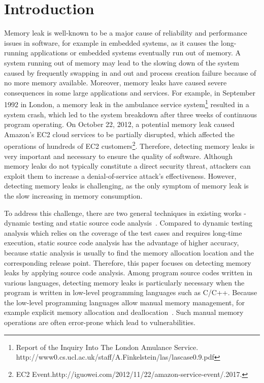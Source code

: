 \section{Introduction}\label{sec:intro}
Memory leak is well-known to be a major cause of reliability and performance issues in software, for example in embedded systems, as it causes the long-running applications or embedded systems eventually run out of memory. 
A system running out of memory may lead to the slowing down of the system caused by frequently swapping in and out and process creation failure because of no more memory available. Moreover, memory leaks have caused severe consequences in some large applications and services. For example, in September 1992 in London, a memory leak in the ambulance service system\footnote{Report of the Inquiry Into The London Amulance Service. http://www0.cs.ucl.ac.uk/staff/A.Finkelstein/las/lascase0.9.pdf} resulted in a system crash, which led to the system breakdown after three weeks of continuous program operating. On October 22, 2012, a potential memory leak caused Amazon's EC2 cloud services to be partially disrupted, which affected the operations of hundreds of EC2 customers\footnote{EC2 Event.http://iguowei.com/2012/11/22/amazon-service-event/.2017.}. 
Therefore, detecting memory leaks is very important and necessary to ensure the quality of software. Although memory leaks do not typically constitute a direct security threat, attackers can exploit them to increase a denial-of-service attack’s effectiveness.
However, detecting memory leaks is challenging, as the only symptom of memory leak is the slow increasing in memory consumption.  

To address this challenge, there are two general techniques in existing works - dynamic testing and static source code analysis~\cite{AJ06}. 
Compared to dynamic testing analysis which relies on the coverage of the test cases and requires long-time execution, static source code analysis has the advantage of higher accuracy, because static analysis is usually to find the memory allocation location and the corresponding release point.
Therefore, this paper focuses on detecting memory leaks by applying source code analysis.
Among program source codes written in various languages, detecting memory leaks is particularly necessary when the program is written in low-level programming languages such as C/C++. Because the low-level programming languages allow manual memory management, for example explicit memory allocation and deallocation~\cite{KJMP06}. Such manual memory operations are often error-prone which lead to vulnerabilities. 

